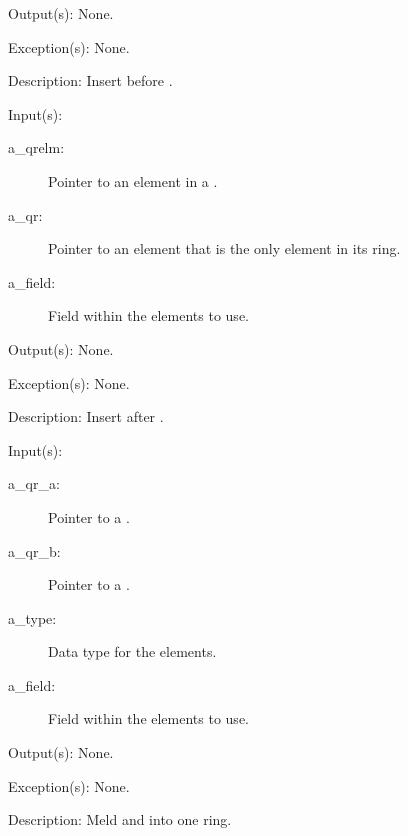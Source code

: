 \begin{capi}
\begin{capilist}
\begin{description}
		\end{description}
	\item[Output(s): ] None.
	\item[Exception(s): ] None.
	\item[Description: ]
		Insert  before .
	\end{capilist}
\label{qr_after_insert}
	\begin{capilist}
	\item[Input(s): ]
		\begin{description}\item[]
		\item[a\_qrelm: ]
			Pointer to an element in a .
		\item[a\_qr: ]
			Pointer to an element that is the only element in its
			ring.
		\item[a\_field: ]
			Field within the  elements to use.
		\end{description}
	\item[Output(s): ] None.
	\item[Exception(s): ] None.
	\item[Description: ]
		Insert  after .
	\end{capilist}
\label{qr_meld}
	\begin{capilist}
	\item[Input(s): ]
		\begin{description}\item[]
		\item[a\_qr\_a: ]
			Pointer to a \classname{qr}.
		\item[a\_qr\_b: ]
			Pointer to a \classname{qr}.
		\item[a\_type: ]
			Data type for the  elements.
		\item[a\_field: ]
			Field within the  elements to use.
		\end{description}
	\item[Output(s): ] None.
	\item[Exception(s): ] None.
	\item[Description: ]
		Meld  and  into one ring.

\end{capilist}
\end{capi}
